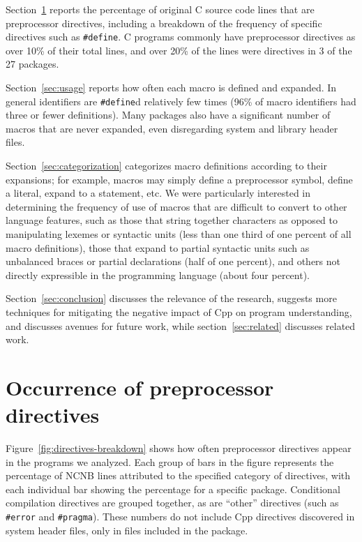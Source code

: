 \documentclass[11pt]{article}
\def\numpackages{27}
\begin{document}
Section~\ref{sec:directives} reports the percentage of original C source
code lines that are preprocessor directives, including a breakdown of the
frequency of specific directives such as {\tt \#define}.  C programs
commonly have preprocessor directives as over 10\% of their total lines,
and over 20\% of the lines were directives in 3 of the {\numpackages}
packages.

Section~\ref{sec:usage} reports how often each macro is defined and
expanded.  In general identifiers are {\tt \#define}d relatively few times
(96\% of macro identifiers had three or fewer definitions).  Many packages
also have a significant number of macros that are never expanded, even
disregarding system and library header files.

Section~\ref{sec:categorization} categorizes macro definitions according to
their expansions; for example, macros may simply define a preprocessor
symbol, define a literal, expand to a statement, etc.  We were particularly
interested in determining the frequency of use of macros that are difficult
to convert to other language features, such as those that string together
characters as opposed to manipulating lexemes or syntactic units (less than
one third of one percent of all macro definitions),
those that expand to partial syntactic units such as unbalanced
braces or partial declarations (half of one percent), and others not 
directly expressible in the programming language (about four percent).

Section~\ref{sec:conclusion} discusses the relevance of the research,
suggests more techniques for mitigating the negative impact of Cpp on
program understanding, and discusses avenues for future work, while
section~\ref{sec:related} discusses related work.


\section{Occurrence of preprocessor directives}
\label{sec:directives}

Figure~\ref{fig:directives-breakdown} shows how often preprocessor
directives appear in the programs we analyzed.  Each group of bars in the
figure represents the percentage of NCNB lines attributed to the specified
category of directives, with each individual bar showing the percentage for
a specific package.  Conditional compilation directives are grouped together, as
are ``other'' directives (such as {\tt \#error} and {\tt \#pragma}).  These
numbers do not include Cpp directives discovered in system header files,
only in files included in the package.
\end{document}
